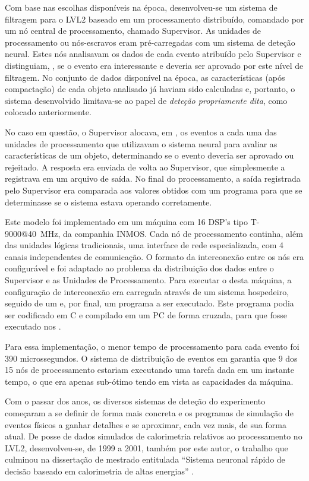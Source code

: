 Com base nas escolhas disponíveis na época, desenvolveu-se um sistema de
filtragem para o LVL2 baseado em um processamento distribuído, comandado por
um nó central de processamento, chamado Supervisor. As unidades de
processamento ou nós-escravos eram pré-carregadas com um sistema de deteção
neural. Estes nós analisavam os dados de cada evento atribuído pelo Supervisor
e distinguiam, , se o evento era interessante e deveria ser
aprovado por este nível de filtragem. No conjunto de dados disponível na
época, as características (após compactação) de cada objeto analisado já
haviam sido calculadas e, portanto, o sistema desenvolvido limitava-se ao papel
de \textit{deteção propriamente dita}, como colocado anteriormente.

No caso em questão, o Supervisor alocava, em , os eventos a
cada uma das unidades de processamento que utilizavam o sistema neural para
avaliar as características de um objeto, determinando se o evento deveria ser
aprovado ou rejeitado. A resposta era enviada de volta ao Supervisor, que
simplesmente a registrava em um arquivo de saída. No final do processamento, a
saída registrada pelo Supervisor era comparada aos valores obtidos com um
programa  para que se determinasse se o sistema estava operando
corretamente.

Este modelo foi implementado em um máquina com 16 DSP's tipo T-9000@40~MHz, da
companhia INMOS. Cada nó de processamento continha, além das unidades lógicas
tradicionais, uma interface de rede especializada, com 4 canais independentes
de comunicação. O formato da interconexão entre os nós era configurável e foi
adaptado ao problema da distribuição dos dados entre o Supervisor e as
Unidades de Processamento. Para executar o  desta máquina, a
configuração de interconexão era carregada através de um sistema hospedeiro,
seguido de um  e, por final, um programa a ser
executado. Este programa podia ser codificado em C e compilado em um PC de
forma cruzada, para que fosse executado nos
.

Para essa implementação, o menor tempo de processamento para cada evento foi
390 microssegundos. O sistema de distribuição de eventos em
 garantia que 9 dos 15 nós de processamento estariam
executando uma tarefa dada em um instante tempo, o que era apenas sub-ótimo
tendo em vista as capacidades da máquina.

Com o passar dos anos, os diversos sistemas de deteção do experimento
começaram a se definir de forma mais concreta e os programas de simulação de
eventos físicos a ganhar detalhes e se aproximar, cada vez mais, de sua forma
atual. De posse de dados simulados de calorimetria relativos ao processamento
no LVL2, desenvolveu-se, de 1999 a 2001, também por este autor, o trabalho que
culminou na dissertação de mestrado entitulada ``Sistema neuronal rápido de
decisão baseado em calorimetria de altas energias'' \cite{aa:msc-thesis}.

